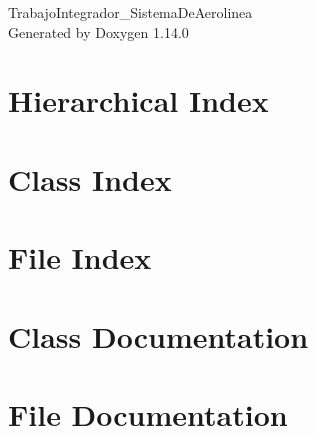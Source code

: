 \documentclass[twoside]{book}
\newcommand{\+}{\discretionary{\mbox{\scriptsize$\hookleftarrow$}}{}{}}
\newcommand{\clearemptydoublepage}{%
    \newpage{\pagestyle{empty}\cleardoublepage}%
  }
\begin{document}
  \raggedbottom
    \hypersetup{pageanchor=false,
                bookmarksnumbered=true,
                pdfencoding=unicode
               }
  \begin{titlepage}
  \vspace*{7cm}
  \begin{center}%
  {\Large Trabajo\+Integrador\+\_\+\+Sistema\+De\+Aerolinea}\\
  \vspace*{1cm}
  {\large Generated by Doxygen 1.14.0}\\
  \end{center}
  \end{titlepage}
  \clearemptydoublepage
  \tableofcontents
  \clearemptydoublepage
  \hypersetup{pageanchor=true}
\chapter{Hierarchical Index}

\chapter{Class Index}

\chapter{File Index}

\chapter{Class Documentation}

















\chapter{File Documentation}






  \backmatter
  \newpage
  \clearemptydoublepage
  \printindex
\end{document}
